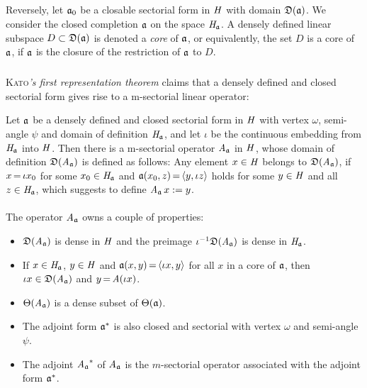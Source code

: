 \documentclass[11pt,twoside]{article}
\begin{document}
\subparagraph*{}
Reversely,
let $\mathfrak{a}_0$ be a closable sectorial form in $\mathit{H}$
with domain $\mathfrak{D}(\mathfrak{a})$.
We consider the closed completion $\mathfrak{a}$ on the space $\mathit{H}_{\mathfrak{a}}$.
A densely defined linear subspace $D \subset \mathfrak{D}(\mathfrak{a})$ is denoted
a \textit{core} of $\mathfrak{a}$,
or equivalently,
the set $D$ is a core of $\mathfrak{a}$,
if $\mathfrak{a}$ is the closure of the restriction of $\mathfrak{a}$ to $D$.

\subparagraph*{}
\textsc{Kato}\textit{'s first representation theorem} claims that
a densely defined and closed sectorial form gives rise
to a m-sectorial linear operator:

\begin{theorem}\label{FIRST_REPRESENTATION_THEOREM}
Let $\mathfrak{a}$ be a densely defined and closed sectorial form in $\mathit{H}$
with vertex $\omega$, semi-angle $\psi$ and domain of definition $\mathit{H}_{\mathfrak{a}}$,
and let $\iota$ be the continuous embedding from $\mathit{H}_{\mathfrak{a}}$ into $\mathit{H}$.
Then there is a m-sectorial operator $\mathit{A}_{\mathfrak{a}}$ in $\mathit{H}$,
whose domain of definition $\mathfrak{D}(\mathit{A}_{\mathfrak{a}})$ is defined as follows:
Any element $x \in \mathit{H}$ belongs to $\mathfrak{D}(\mathit{A}_{\mathfrak{a}})$,
if $x {\,=\,} \iota x_0$ for some $x_0 \in \mathit{H}_{\mathfrak{a}}$ and
$\mathfrak{a}(x_0,z) {\,=\,} \langle y,\iota z \rangle$ holds
for some $y \in \mathit{H}$ and all $z \in \mathit{H}_{\mathfrak{a}}$,
which suggests to define $\mathit{A}_{\mathfrak{a}} \, x := y$.

\paragraph*{}
The operator $\mathit{A}_{\mathfrak{a}}$ owns a couple of properties:

\begin{itemize}[leftmargin=5mm]
\item[(a)]
$\mathfrak{D}(\mathit{A}_{\mathfrak{a}})$ is dense in $\mathit{H}$
and the preimage $\iota^{-1} \mathfrak{D}(\mathit{A}_{\mathfrak{a}})$
is dense in $\mathit{H}_{\mathfrak{a}}$.

\item[(b)]
If $x \in \mathit{H}_{\mathfrak{a}}$, $y \in \mathit{H}$
and $\mathfrak{a}(x,y) {\,=\,} \langle \iota x,y \rangle$ for all $x$ in a core of $\mathfrak{a}$,
then $\iota x \in \mathfrak{D}(\mathit{A}_{\mathfrak{a}})$ and $y {\,=\,} \mathit{A} (\iota x)$.

\item[(c)]
$\Theta(\mathit{A}_{\mathfrak{a}})$ is a dense subset of $\Theta(\mathfrak{a})$.

\item[(d)]
The adjoint form $\mathfrak{a}^*$ is also closed and sectorial
with vertex $\omega$ and semi-angle $\psi$.

\item[(e)]
The adjoint ${\mathit{A}_{\mathfrak{a}}}^*$ of $\mathit{A}_{\mathfrak{a}}$
is the $m$-sectorial operator associated with the adjoint form $\mathfrak{a}^*$.
\end{itemize}
\end{theorem}
\end{document}
